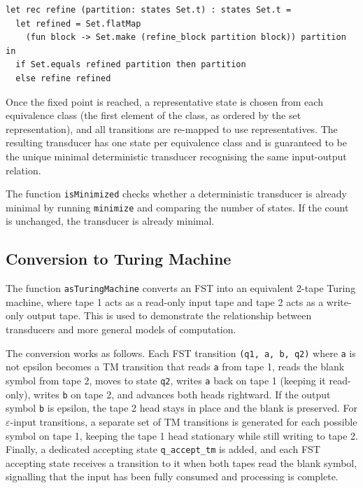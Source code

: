 \begin{verbatim}
let rec refine (partition: states Set.t) : states Set.t =
  let refined = Set.flatMap
    (fun block -> Set.make (refine_block partition block)) partition in
  if Set.equals refined partition then partition
  else refine refined
\end{verbatim}

Once the fixed point is reached, a representative state is chosen from each equivalence class 
(the first element of the class, as ordered by the set representation), and all transitions are re-mapped to use representatives. 
The resulting transducer has one state per equivalence class and is guaranteed to be the unique minimal deterministic 
transducer recognising the same input-output relation.

The function \texttt{isMinimized} checks whether a deterministic transducer is already minimal by running 
\texttt{minimize} and comparing the number of states. If the count is unchanged, the transducer is already minimal.

\subsection{Conversion to Turing Machine}

The function \texttt{asTuringMachine} converts an FST into an equivalent 2-tape Turing machine, 
where tape 1 acts as a read-only input tape and tape 2 acts as a write-only output tape. 
This is used to demonstrate the relationship between transducers and more general models of computation.

The conversion works as follows. Each FST transition \texttt{(q1, a, b, q2)} where \texttt{a} is not epsilon becomes
 a TM transition that reads \texttt{a} from tape 1, reads the blank symbol from tape 2, 
 moves to state \texttt{q2}, writes \texttt{a} back on tape 1 (keeping it read-only), writes \texttt{b} on tape 2, 
 and advances both heads rightward. If the output symbol \texttt{b} is epsilon, the tape 2 head stays in place and 
 the blank is preserved. For $\varepsilon$-input transitions, a separate set of TM transitions is generated for 
 each possible symbol on tape 1, keeping the tape 1 head stationary while still writing to tape 2. Finally, 
 a dedicated accepting state \texttt{q\_accept\_tm} is added, and each FST accepting state receives a transition 
 to it when both tapes read the blank symbol, signalling that the input has been fully consumed and processing is complete.

